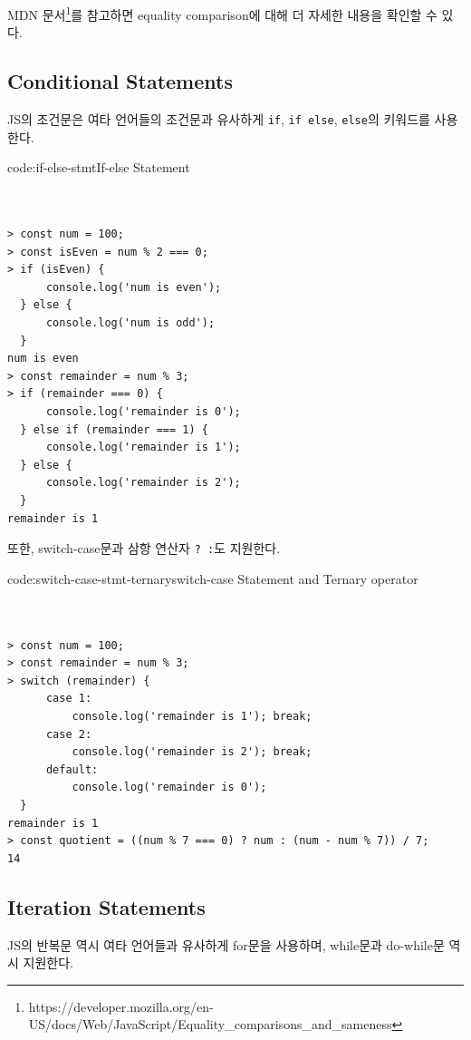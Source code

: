 
MDN 문서\footnote{https://developer.mozilla.org/en-US/docs/Web/JavaScript/Equality\_comparisons\_and\_sameness}를 참고하면 equality comparison에 대해 더 자세한 내용을 확인할 수 있다.

\subsection*{Conditional Statements}

JS의 조건문은 여타 언어들의 조건문과 유사하게 \texttt{if}, \texttt{if else}, \texttt{else}의 키워드를 사용한다.

\begin{codeenv}{code:if-else-stmt}{If-else Statement}\begin{verbatim}


> const num = 100;
> const isEven = num % 2 === 0;
> if (isEven) {
      console.log('num is even');
  } else {
      console.log('num is odd');
  }
num is even
> const remainder = num % 3;
> if (remainder === 0) {
      console.log('remainder is 0');
  } else if (remainder === 1) {
      console.log('remainder is 1');
  } else {
      console.log('remainder is 2');
  }
remainder is 1
\end{verbatim}
\end{codeenv}
\newpage

또한, switch-case문과 삼항 연산자 \texttt{? :}도 지원한다.

\begin{codeenv}{code:switch-case-stmt-ternary}{switch-case Statement and Ternary operator}\begin{verbatim}


> const num = 100;
> const remainder = num % 3;
> switch (remainder) {
      case 1:
          console.log('remainder is 1'); break;
      case 2:
          console.log('remainder is 2'); break;
      default:
          console.log('remainder is 0');
  }
remainder is 1
> const quotient = ((num % 7 === 0) ? num : (num - num % 7)) / 7;
14
\end{verbatim}
\end{codeenv}

\subsection*{Iteration Statements}

JS의 반복문 역시 여타 언어들과 유사하게 for문을 사용하며, while문과 do-while문 역시 지원한다.

